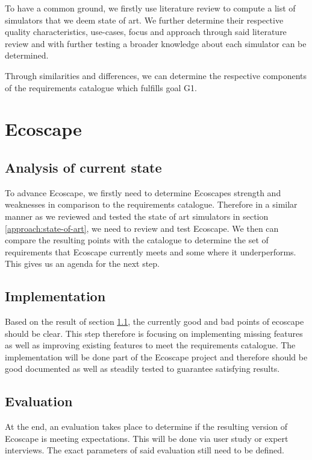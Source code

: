 To have a common ground, we firstly use literature review to compute a list of simulators that we deem state of art.
We further determine their respective quality characteristics, use-cases, focus and approach through said literature review and with further testing a broader knowledge about each simulator can be determined.

Through similarities and differences, we can determine the respective components of the requirements catalogue which fulfills goal G1.

\section{Ecoscape}\label{approach:ecoscape}
\subsection{Analysis of current state}\label{approach:ecoscape-current-state}
To advance Ecoscape, we firstly need to determine Ecoscapes strength and weaknesses in comparison to the requirements catalogue. 
Therefore in a similar manner as we reviewed and tested the state of art simulators in section \ref{approach:state-of-art}, we need to review and test Ecoscape.
We then can compare the resulting points with the catalogue to determine the set of requirements that Ecoscape currently meets and some where it underperforms.
This gives us an agenda for the next step.

\subsection{Implementation}\label{approach:ecoscape-implementation}
Based on the result of section \ref{approach:ecoscape-current-state}, the currently good and bad points of ecoscape should be clear. This step therefore is focusing on implementing missing features as well as improving existing features 
to meet the requirements catalogue.
The implementation will be done part of the Ecoscape project and therefore should be good documented as well as steadily tested to guarantee satisfying results. 

\subsection{Evaluation}\label{approach:ecoscape-evaluation}
At the end, an evaluation takes place to determine if the resulting version of Ecoscape is meeting expectations. This will be done via user study or expert interviews.
The exact parameters of said evaluation still need to be defined.